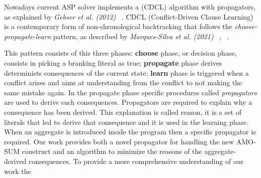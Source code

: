 
Nowadays current ASP solver implements a (CDCL) algorithm with propagators, 
as explained by \textit{Gebser et al. (2012)} ~\cite{DBLP:journals/ai/GebserKS12}.
CDCL (Conflict-Driven Clause Learning) is a contemporary form of non-chronological 
backtracking that follows the \textit{choose-propagate-learn} pattern, 
as described by \textit{Marques-Silva et al. (2021)} ~\cite{DBLP:series/faia/0001LM21}, ~\cite{DIMCAS}.

This pattern consists of this three phases: 
\textbf{choose} phase, or decision phase, consists in picking a branking literal as true; 
\textbf{propagate} phase derives determinists consequences of the current state;
\textbf{learn} phase is triggered when a conflict arises and aims at understanding from the conflict 
to not making the same mistake again.
In the propagate phase  specific procedures called \textit{propagators} are used to derive such consequences.
Propagators are required to explain why a consequence has been derived.
This explanation is called reason, it is a set of literals that led to derive that consequence 
and it is used in the learning phase.
When an aggregate is introduced inside the program then a specific propagator is required.
Our work provides both a novel propagator for handling the new AMO-SUM construct and 
an algorithm to minimize the reasons of the aggregate-derived consequences.
To provide a more comprehensive understanding of our work the 



